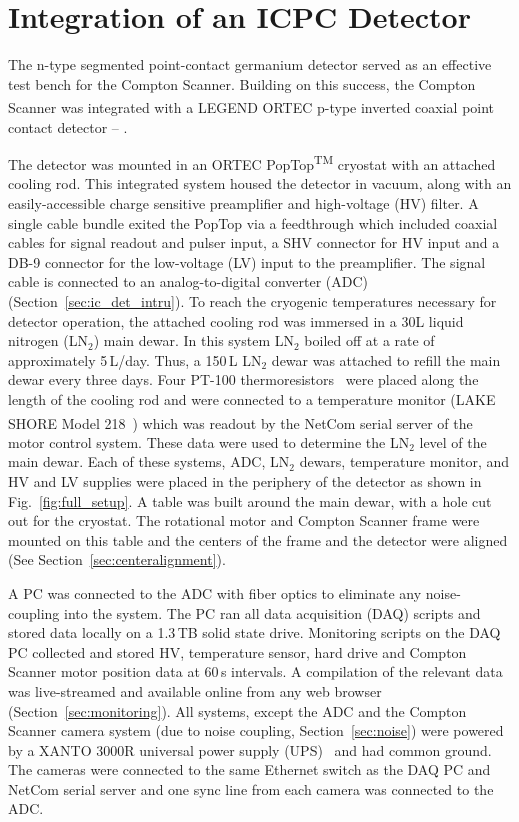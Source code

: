 \chapter{Integration of an ICPC Detector}\label{chap:integration}

The n-type segmented point-contact germanium detector served as an effective test bench for the Compton Scanner. Building on this success, the Compton Scanner was integrated with a LEGEND ORTEC\textsuperscript{\tiny\textregistered} p-type inverted coaxial point contact detector -- \IC{}. 

The detector was mounted in an ORTEC\textsuperscript{\tiny\textregistered} PopTop\textsuperscript{\tiny TM} cryostat with an attached cooling rod. This integrated system housed the detector in vacuum, along with an easily-accessible charge sensitive preamplifier and high-voltage (HV) filter. A single cable bundle exited the PopTop via a feedthrough which included coaxial cables for signal readout and pulser input, a SHV connector for HV input and a DB-9 connector for the low-voltage (LV) input to the preamplifier. The signal cable is connected to an analog-to-digital converter (ADC) (Section~\ref{sec:ic_det_intru}). To reach the cryogenic temperatures necessary for detector operation, the attached cooling rod was immersed in a 30L liquid nitrogen (LN$_2$) main dewar. In this system LN$_2$ boiled off at a rate of approximately 5\,L/day. Thus, a 150\,L LN$_2$ dewar was attached to refill the main dewar every three days. Four PT-100 thermoresistors~\cite{pt100} were placed along the length of the cooling rod and were connected to a temperature monitor (LAKE SHORE\textsuperscript{\tiny\textregistered} Model 218~\cite{lakeshore}) which was readout by the NetCom serial server of the motor control system. These data were used to determine the LN$_2$ level of the main dewar.  Each of these systems, ADC, LN$_2$ dewars, temperature monitor, and HV and LV supplies were placed in the periphery of the detector as shown in Fig.~\ref{fig:full_setup}. A table was built around the main dewar, with a hole cut out for the cryostat. The rotational motor and Compton Scanner frame were mounted on this table and the centers of the frame and the detector were aligned (See Section~\ref{sec:centeralignment}).

A PC was connected to the ADC with fiber optics to eliminate any noise-coupling into the system. The PC ran all data acquisition (DAQ) scripts and stored data locally on a 1.3\,TB solid state drive. Monitoring scripts on the DAQ PC collected and stored HV, temperature sensor, hard drive and Compton Scanner motor position data at 60\,s intervals. A compilation of the relevant data was live-streamed and available online from any web browser (Section~\ref{sec:monitoring}). All systems, except the ADC and the Compton Scanner camera system (due to noise coupling, Section~\ref{sec:noise}) were powered by a XANTO 3000R universal power supply (UPS)~\cite{ups} and had common ground. The cameras were connected to the same Ethernet switch as the DAQ PC and NetCom serial server and one sync line from each camera was connected to the ADC.

